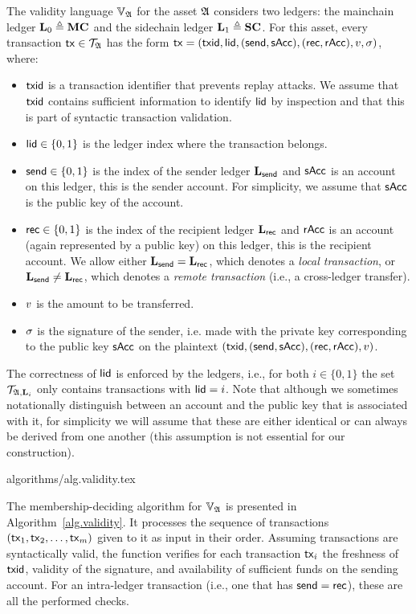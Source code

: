 The validity language $\mathbb{V}_{\mathfrak{A}}$ for the asset $\mathfrak{A}$ considers
two ledgers: the mainchain ledger $\mathbf{L}_0\triangleq\mathbf{MC}$ and the sidechain ledger
$\mathbf{L}_1\triangleq\mathbf{SC}$. For this asset, every transaction $\mathsf{tx}\in\mathcal{T}_{\mathfrak{A}}$ has the form
$
\mathsf{tx}=\left(
  \mathsf{txid},
  \mathsf{lid},
  (\mathsf{send}, \mathsf{sAcc}),
  (\mathsf{rec}, \mathsf{rAcc}),
  v,
  \sigma
\right)
$,
where:
\begin{itemize}
  \item $\mathsf{txid}$ is a transaction identifier that prevents replay attacks.
    We assume that
    $\mathsf{txid}$ contains sufficient information to identify $\mathsf{lid}$ by inspection
    and that this is part of syntactic transaction validation.
  \item $\mathsf{lid} \in \{0, 1\}$ is the ledger index where the transaction belongs.
  \item $\mathsf{send} \in \{0, 1\}$ is the index of the sender ledger $\mathbf{L}_{\mathsf{send}}$ and
    $\mathsf{sAcc}$ is an account  on this ledger,
    this is the sender account. For simplicity, we assume that $\mathsf{sAcc}$ is
    the public key of the account.
  \item $\mathsf{rec} \in \{0, 1\}$ is the index of the recipient ledger $\mathbf{L}_{\mathsf{rec}}$ and
    $\mathsf{rAcc}$ is an account (again represented by a public key) on this
    ledger, this is the recipient account.
    We allow either $\mathbf{L}_{\mathsf{send}}=\mathbf{L}_{\mathsf{rec}}$, which denotes a \emph{local
    transaction}, or $\mathbf{L}_{\mathsf{send}}\neq\mathbf{L}_{\mathsf{rec}}$, which denotes a
    \emph{remote transaction} (i.e., a cross-ledger transfer).
\item $v$ is the amount to be transferred.
\item $\sigma$ is the signature of the sender, i.e. made with the private key
      corresponding to the public key $\mathsf{sAcc}$ on the plaintext
      $(\mathsf{txid}, (\mathsf{send}, \mathsf{sAcc}), (\mathsf{rec}, \mathsf{rAcc}), v)$.
\end{itemize}
The correctness of $\mathsf{lid}$ is enforced by the ledgers, i.e., for
both $i\in\{0,1\}$ the set $\mathcal{T}_{\mathfrak{A},\mathbf{L}_i}$ only contains transactions
with $\mathsf{lid}=i$.
Note that although we sometimes notationally distinguish between an account and the
public key that is associated with it, for simplicity we will assume that these
are either identical or can always be derived from one another (this assumption is not
essential for our construction).

{algorithms/alg.validity.tex}

The membership-deciding algorithm for $\mathbb{V}_{\mathfrak{A}}$
is presented in Algorithm~\ref{alg.validity}.
It
processes the sequence of transactions $(\mathsf{tx}_1, \mathsf{tx}_2, \dots,
\mathsf{tx}_m)$ given to it as input in their order. Assuming transactions are
syntactically valid, the function verifies for each transaction $\mathsf{tx}_i$ the
freshness of $\mathsf{txid}$, validity of the signature, and availability of sufficient
funds on the sending account. For an intra-ledger transaction (i.e., one that
has $\mathsf{send}=\mathsf{rec}$), these are all the performed checks.

